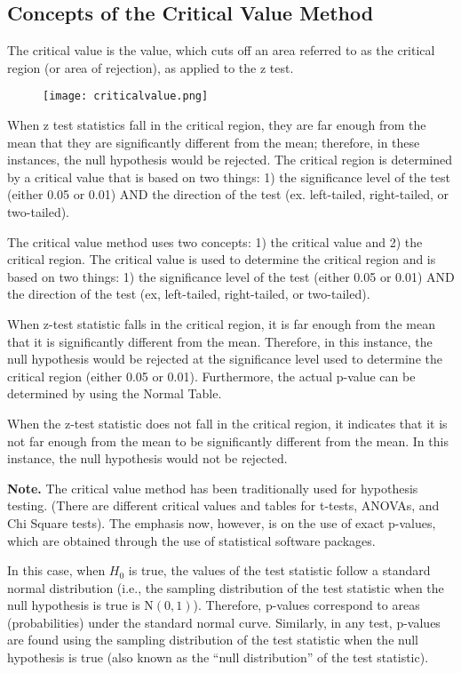 \documentclass[10pt, a4paper]{article}
\begin{document}
\subsection{Concepts of the Critical Value Method}
The critical value is the value, which cuts off an area referred to as the critical region (or area of rejection), as applied to the z test.
\begin{figure}
    [h!]
    \centering
    \texttt{[image: criticalvalue.png]}
\end{figure}
When z test statistics fall in the critical region, they are far enough from the mean that they are significantly different from the mean; therefore, in these instances, the null hypothesis would be rejected. The critical region is determined by a critical value that is based on two things: 1) the significance level of the test (either 0.05 or 0.01) AND the direction of the test (ex. left-tailed, right-tailed, or two-tailed).\par
The critical value method uses two concepts: 1) the critical value and 2) the critical region. The critical value is used to determine the critical region and is based on two things: 1) the significance level of the test (either 0.05 or 0.01) AND the direction of the test (ex, left-tailed, right-tailed, or two-tailed).\par
When z-test statistic falls in the critical region, it is far enough from the mean that it is significantly different from the mean. Therefore, in this instance, the null hypothesis would be rejected at the significance level used to determine the critical region (either 0.05 or 0.01). Furthermore, the actual p-value can be determined by using the Normal Table.\par
When the z-test statistic does not fall in the critical region, it indicates that it is not far enough from the mean to be significantly different from the mean. In this instance, the null hypothesis would not be rejected.\par
\textbf{Note.} The critical value method has been traditionally used for hypothesis testing. (There are different critical values and tables for t-tests, ANOVAs, and Chi Square tests). The emphasis now, however, is on the use of exact p-values, which are obtained through the use of statistical software packages.\par
In this case, when $H_0$ is true, the values of the test statistic follow a standard normal distribution (i.e., the sampling distribution of the test statistic when the null hypothesis is true is $\mathrm{N}(0, 1)$). Therefore, p-values correspond to areas (probabilities) under the standard normal curve.
Similarly, in any test, p-values are found using the sampling distribution of the test statistic when the null hypothesis is true (also known as the ``null distribution'' of the test statistic).
\end{document}

